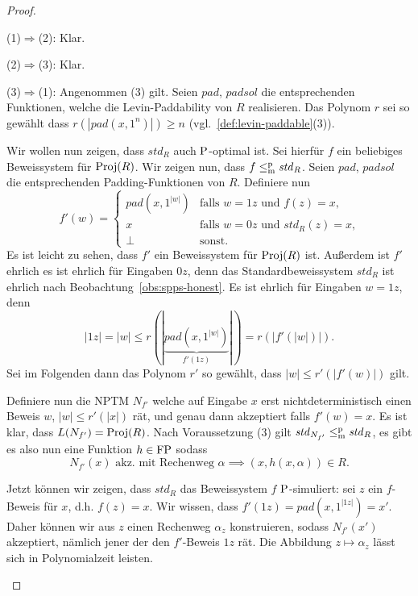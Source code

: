 \begin{proof}
\begin{prooflist}[label={}]
\item (1)$\Rightarrow$(2): Klar.

\item (2)$\Rightarrow$(3): Klar.

\item (3)$\Rightarrow$(1): Angenommen (3) gilt. 
    Seien $\mathit{pad}$, $\mathit{padsol}$ die entsprechenden Funktionen, welche die Levin-Paddability von $R$ realisieren. Das Polynom $r$ sei so gewählt dass $r(|\mathit{pad}(x, 1^n)|)\geq n$ (vgl.~\ref{def:levin-paddable}(3)).

    Wir wollen nun zeigen, dass $\mathit{std}_R$ auch $\P$-optimal ist. Sei hierfür $f$ ein beliebiges Beweissystem für $\Proj(R)$. Wir zeigen nun, dass $f\leqmp \mathit{std}_R$. Seien $\mathit{pad}$, $\mathit{padsol}$ die entsprechenden Padding-Funktionen von $R$.
    Definiere nun
    \[ f'(w) = \begin{cases} \mathit{pad}(x, 1^{|w|}) & \text{falls $w=1z$ und $f(z) = x$,} \\
    x & \text{falls $w=0z$ und $\mathit{std}_R(z)=x$,} \\ \bot & \text{sonst.} \end{cases} \]
    Es ist leicht zu sehen, dass $f'$ ein Beweissystem für $\Proj(R)$ ist. Außerdem ist $f'$ ehrlich es ist ehrlich für Eingaben $0z$, denn das Standardbeweissystem $\mathit{std}_R$ ist ehrlich nach Beobachtung~\ref{obs:spps-honest}. Es ist ehrlich für Eingaben $w=1z$, denn
    \[ |1z| = |w| \leq r(|\underbrace{\mathit{pad}(x, 1^{|w|})}_{f'(1z)}|) = r(|f'(|w|)|). \]
    Sei im Folgenden dann das Polynom $r'$ so gewählt, dass $|w|\leq r'(|f'(w)|)$ gilt.

    Definiere nun die NPTM $N_{f'}$ welche auf Eingabe $x$ erst nichtdeterministisch einen Beweis $w$, $|w|\leq r'(|x|)$ rät, und genau dann akzeptiert falls $f'(w)=x$.
    Es ist klar, dass $L(N_{f'}) = \Proj(R)$.
    Nach Voraussetzung (3) gilt $\mathit{std}_{N_{f'}}\leqmp \mathit{std}_R$, es gibt es also nun eine Funktion $h\in\FP$ sodass 
    \begin{equation} N_{f'}(x) \text{ akz. mit Rechenweg $\alpha$} \implies (x,h(x,\alpha))\in R.  \label{eq:stdps-q-1}
    \end{equation}

    Jetzt können wir zeigen, dass $\mathit{std}_R$ das Beweissystem $f$ $\P$-simuliert: sei $z$ ein $f$-Beweis für $x$, d.h. $f(z)=x$.
    Wir wissen, dass $f'(1z)=\mathit{pad}(x, 1^{|1z|})=x'$.
    Daher können wir aus $z$ einen Rechenweg $\alpha_z$ konstruieren, sodass $N_{f'}(x')$ akzeptiert, nämlich jener der den $f'$-Beweis $1z$ rät.
    Die Abbildung $z\mapsto \alpha_z$ lässt sich in Polynomialzeit leisten.


\end{prooflist}
\end{proof}
